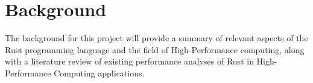 \chapter{Background}
\label{ch:background}


The background for this project will provide a summary of relevant aspects of the Rust programming language and the field of High-Performance computing, along with a literature review of existing performance analyses of Rust in High-Performance Computing applications.













